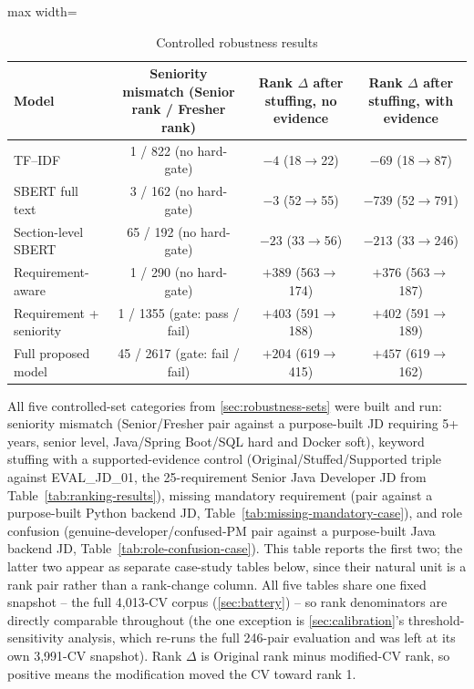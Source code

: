 \documentclass[12pt,a4paper,oneside]{report}
\begin{document}
\begin{table}[htbp]
\centering
\caption{Controlled robustness results}
\label{tab:robustness-results}
\begin{adjustbox}{max width=\textwidth}
\begin{tabular}{lccc}
\toprule
Model & Seniority mismatch (Senior rank / Fresher rank) & Rank $\Delta$ after stuffing, no evidence & Rank $\Delta$ after stuffing, with evidence \\
\midrule
TF--IDF & 1 / 822 (no hard-gate) & $-4$ (18$\to$22) & $-69$ (18$\to$87) \\
SBERT full text & 3 / 162 (no hard-gate) & $-3$ (52$\to$55) & $-739$ (52$\to$791) \\
Section-level SBERT & 65 / 192 (no hard-gate) & $-23$ (33$\to$56) & $-213$ (33$\to$246) \\
Requirement-aware & 1 / 290 (no hard-gate) & $+389$ (563$\to$174) & $+376$ (563$\to$187) \\
Requirement + seniority & 1 / 1355 (gate: pass / fail) & $+403$ (591$\to$188) & $+402$ (591$\to$189) \\
Full proposed model & 45 / 2617 (gate: fail / fail) & $+204$ (619$\to$415) & $+457$ (619$\to$162) \\
\bottomrule
\end{tabular}
\end{adjustbox}
\end{table}

All five controlled-set categories from \cref{sec:robustness-sets} were built and run: seniority mismatch (Senior/Fresher pair against a purpose-built JD requiring 5+ years, senior level, Java/Spring Boot/SQL hard and Docker soft), keyword stuffing with a supported-evidence control (Original/Stuffed/Supported triple against EVAL\_JD\_01, the 25-requirement Senior Java Developer JD from Table~\ref{tab:ranking-results}), missing mandatory requirement (pair against a purpose-built Python backend JD, Table~\ref{tab:missing-mandatory-case}), and role confusion (genuine-developer/confused-PM pair against a purpose-built Java backend JD, Table~\ref{tab:role-confusion-case}). This table reports the first two; the latter two appear as separate case-study tables below, since their natural unit is a rank pair rather than a rank-change column. All five tables share one fixed snapshot -- the full 4,013-CV corpus (\cref{sec:battery}) -- so rank denominators are directly comparable throughout (the one exception is \cref{sec:calibration}'s threshold-sensitivity analysis, which re-runs the full 246-pair evaluation and was left at its own 3,991-CV snapshot). Rank $\Delta$ is Original rank minus modified-CV rank, so positive means the modification moved the CV toward rank 1.
\end{document}
